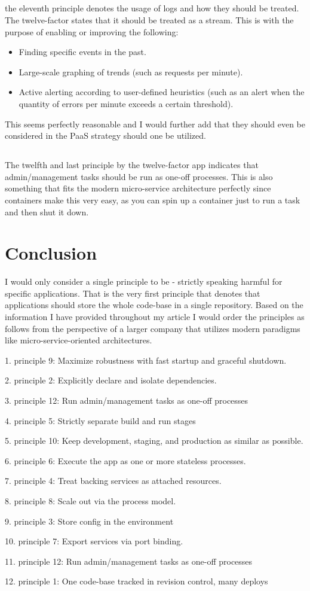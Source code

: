 \documentclass[a4paper,10pt]{article}
\begin{document}
	\subsection{}
	the eleventh principle denotes the usage of logs and how they should be treated. The twelve-factor states that it should be treated as a stream. This is with the purpose of enabling or improving the following: 
	\begin{itemize}
		\item Finding specific events in the past.
		\item Large-scale graphing of trends (such as requests per minute).
		\item Active alerting according to user-defined heuristics (such as an alert when the quantity of errors per minute exceeds a certain threshold).
	\end{itemize}
	This seems perfectly reasonable and I would further add that they should even be considered in the PaaS strategy should one be utilized.
	
	\subsection{}
	The twelfth and last principle by the twelve-factor app indicates that admin/management tasks should be run as one-off processes. This is also something that fits the modern micro-service architecture perfectly since containers make this very easy, as you can spin up a container just to run a task and then shut it down.
	
	\section{Conclusion}
	I would only consider a single principle to be - strictly speaking harmful for specific applications. That is the very first principle that denotes that applications should store the whole code-base in a single repository. Based on the information I have provided throughout my article I would order the principles as follows from the perspective of a larger company that utilizes modern paradigms like micro-service-oriented architectures.
	
	\begin{list}{}{5}
		\item1. principle 9: Maximize robustness with fast startup and graceful shutdown.
		\item2. principle 2: Explicitly declare and isolate dependencies.
		\item3. principle 12: Run admin/management tasks as one-off processes  
		\item4. principle 5: Strictly separate build and run stages
		\item5. principle 10: Keep development, staging, and production as similar as possible. 
		\item6. principle 6: Execute the app as one or more stateless processes. 
		\item7. principle 4: Treat backing services as attached resources.
		\item8. principle 8: Scale out via the process model.
		\item9. principle 3: Store config in the environment
		\item10. principle 7: Export services via port binding.
		\item11. principle 12: Run admin/management tasks as one-off processes
		\item12. principle 1: One code-base tracked in revision control, many deploys
	\end{list}
	
		
	
\end{document}
